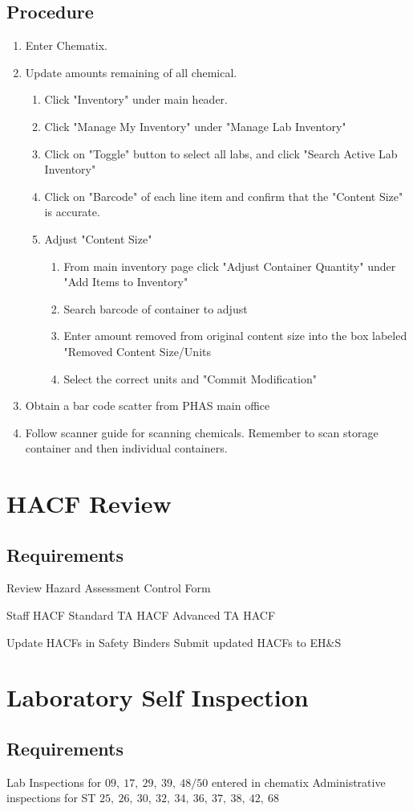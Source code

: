 \documentclass[justified]{tufte-book}
\begin{document}
\subsection{Procedure}
\begin{enumerate}
	\item Enter Chematix.
	\item Update amounts remaining of  all chemical.
	\begin{enumerate}
		\item Click "Inventory" under main header.
		\item Click "Manage My Inventory" under "Manage Lab Inventory"
		\item Click on "Toggle" button to select all labs, and click "Search Active Lab 				Inventory"
		\item Click on "Barcode" of each line item and confirm that the "Content Size" is 			accurate.
		\item Adjust "Content Size"
		\begin{enumerate}
			\item From main inventory page click "Adjust Container Quantity" under "Add Items 			to Inventory"
			\item Search barcode of container to adjust
			\item Enter amount removed from original content size into the box labeled 					"Removed	 Content Size/Units
			\item Select the correct units and "Commit Modification"
		\end{enumerate}
	\end{enumerate}
	\item Obtain a bar code scatter from PHAS main office
	\item Follow scanner guide for scanning chemicals. Remember to scan storage container and 	then individual containers.
\end{enumerate}



\newpage
\section{\bf HACF Review}
\subsection{Requirements}
\begin{itemize}
	\Item Review Hazard Assessment Control Form
	\begin{itemize}
		\Item Staff HACF
		\Item Standard TA HACF
		\Item Advanced TA HACF
	\end{itemize}
	\Item Update HACFs in Safety Binders
	\Item Submit updated HACFs to EH\&S
\end{itemize}

\section{\bf Laboratory Self Inspection}
\subsection{Requirements}
\begin{itemize}
	\Item Lab Inspections for $09,\ 17,\ 29,\ 39,\ 48/50$ entered in chematix
	\Item Administrative inspections for ST $25,\ 26,\ 30,\ 32,\ 34,\ 36,\ 37,\ 38,\ 42,\ 68$
\end{itemize}
\end{document}

